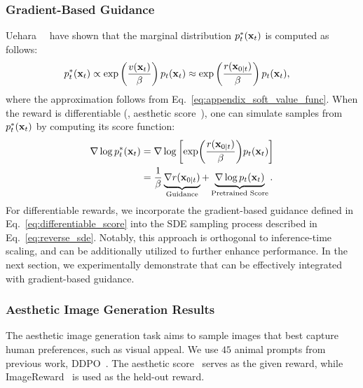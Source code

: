 \subsubsection{Gradient-Based Guidance}
Uehara~\etal~\cite{Uehara:2024Bridging} have shown that the marginal distribution $p^{*}_t(\mathbf{x}_t)$ is computed as follows:
\begin{align}
    \nonumber
    p^{*}_t(\mathbf{x}_t) &\propto \exp \left( \frac{v(\mathbf{x}_t)}{\beta} \right) p_t(\mathbf{x}_t) \approx \exp \left( \frac{r(\mathbf{x}_{0|t})}{\beta} \right) p_t(\mathbf{x}_t),
\end{align}
where the approximation follows from Eq.~\ref{eq:appendix_soft_value_func}. 
When the reward is differentiable (\eg, aesthetic score~\cite{Schuhmann:aesthetics}), one can simulate samples from $p^{*}_t(\mathbf{x}_t)$ by computing its score function:
\begin{align}
    \nonumber
    \label{eq:differentiable_score}
    \nabla \log p_t^{*}(\mathbf{x}_t) &= \nabla \log \left[ \exp (\frac{r(\mathbf{x}_{0|t})}{\beta}) p_t(\mathbf{x}_t) \right] \\
    &= \frac{1}{\beta} \underbrace{\nabla r (\mathbf{x}_{0|t})}_{\text{Guidance}} + \underbrace{\nabla \log p_t(\mathbf{x}_t)}_{\text{Pretrained Score}}.
\end{align}
For differentiable rewards, we incorporate the gradient-based guidance defined in Eq.~\ref{eq:differentiable_score} into the SDE sampling process described in Eq.~\ref{eq:reverse_sde}. 
Notably, this approach is orthogonal to inference-time scaling, and \Ours{} can be additionally utilized to further enhance performance. 
In the next section, we experimentally demonstrate that \Ours{} can be effectively integrated with gradient-based guidance. 

\subsubsection{Aesthetic Image Generation Results}
The aesthetic image generation task aims to sample images that best capture human preferences, such as visual appeal. We use $45$ animal prompts from previous work, DDPO~\cite{Black2024:DDPO}. The aesthetic score~\cite{Schuhmann:aesthetics} serves as the given reward, while ImageReward~\cite{Xu2023:ImageReward} is used as the held-out reward. 

